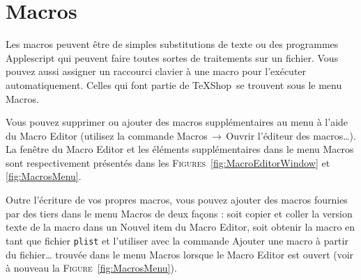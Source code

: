 \documentclass[11pt,french]{article}
\newcommand{\TS}{\textsf{\TeX Shop}}
\newcommand{\mnu}[1]{\textsf{#1}}
\newcommand{\To}{\,\(\to\)\,}
\begin{document}




\section{Macros}

Les macros peuvent être de simples substitutions de texte ou des programmes Applescript qui peuvent faire toutes sortes de traitements sur un fichier. Vous pouvez aussi assigner un raccourci clavier à une macro pour l'exécuter automatiquement. Celles qui font partie de \TS\ se trouvent sous le menu \mnu{Macros}.

Vous pouvez supprimer ou ajouter des macros supplémentaires au menu à l'aide du \mnu{Macro Editor} (utilisez la commande \mnu{Macros}\To\mnu{Ouvrir l'éditeur des macros…}). La fenêtre du \mnu{Macro Editor} et les éléments supplémentaires dans le menu \mnu{Macros} sont respectivement présentés dans les \textsc{Figures}~\ref{fig:MacroEditorWindow} et \vref{fig:MacrosMenu}.

Outre l'écriture de vos propres macros, vous pouvez ajouter des macros fournies par des tiers dans le menu \mnu{Macros} de deux façons : soit copier et coller la version texte de la macro dans un \mnu{Nouvel item} du \mnu{Macro Editor}, soit obtenir la macro en tant que fichier \texttt{plist} et l'utiliser avec la commande \mnu{Ajouter une macro à partir du fichier…} trouvée dans le menu \mnu{Macros} lorsque le \mnu{Macro Editor} est ouvert (voir à nouveau la \textsc{Figure}~\vref{fig:MacrosMenu}).
\end{document}
